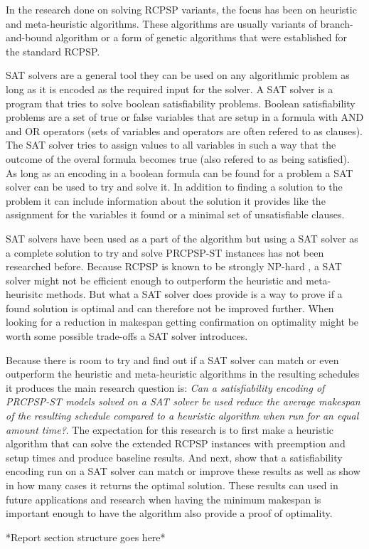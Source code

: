 In the research done on solving RCPSP variants, the focus has been on heuristic and meta-heuristic algorithms. These algorithms are usually variants of branch-and-bound algorithm \cite{RN21} or a form of genetic algorithms \cite{RN28} that were established for the standard RCPSP.

SAT solvers are a general tool they can be used on any algorithmic problem as long as it is encoded as the required input for the solver. A SAT solver is a program that tries to solve boolean satisfiability problems. Boolean satisfiability problems are a set of true or false variables that are setup in a formula with AND and OR operators (sets of variables and operators are often refered to as clauses). The SAT solver tries to assign values to all variables in such a way that the outcome of the overal formula becomes true (also refered to as being satisfied). As long as an encoding in a boolean formula can be found for a problem a SAT solver can be used to try and solve it. In addition to finding a solution to the problem it can include information about the solution it provides like the assignment for the variables it found or a minimal set of unsatisfiable clauses.

SAT solvers have been used as a part of the algorithm but using a SAT solver as a complete solution to try and solve PRCPSP-ST instances has not been researched before. Because RCPSP is known to be strongly NP-hard \cite{RN20}, a SAT solver might not be efficient enough to outperform the heuristic and meta-heurisitc methods. But what a SAT solver does provide is a way to prove if a found solution is optimal and can therefore not be improved further. When looking for a reduction in makespan getting confirmation on optimality might be worth some possible trade-offs a SAT solver introduces.

Because there is room to try and find out if a SAT solver can match or even outperform the heuristic and meta-heuristic algorithms in the resulting schedules it produces the main research question is: \textit{Can a satisfiability encoding of PRCPSP-ST models solved on a SAT solver be used reduce the average makespan of the resulting schedule compared to a heuristic algorithm when run for an equal amount time?}. The expectation for this research is to first make a heuristic algorithm that can solve the extended RCPSP instances with preemption and setup times and produce baseline results. And next, show that a satisfiability encoding run on a SAT solver can match or improve these results as well as show in how many cases it returns the optimal solution. These results can used in future applications and research when having the minimum makespan is important enough to have the algorithm also provide a proof of optimality.

*Report section structure goes here*